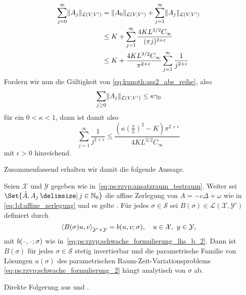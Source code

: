 \begin{Satz}
\begin{Beweis}
        \begin{align}
                    \sum_{j = 0}^{\infty} \lVert A_{j}\rVert_{\mathcal L(V, V')}
            &= \lVert A_{0}\rVert_{\mathcal L(V, V')} + \sum_{j = 1}^{\infty} \lVert A_{j}\rVert_{\mathcal L(V, V')}
            \\&\leq K + \sum_{j = 1}^{\infty} \frac{4 K L^{3 / 2} C_{\infty}}{(\pi j)^{2 + \varepsilon}}
            \\&\leq K + \frac{4 K L^{3 / 2} C_{\infty}}{\pi^{2+ \varepsilon}} \sum_{j = 1}^{\infty} \frac{1}{j^{2 + \varepsilon}}
        \end{align}
        Fordern wir nun die Gültigkeit von \eqref{eq:kunoth:ass2_abs_reihe}, also
        \begin{equation}
            \sum_{j \geq 0} \lVert A_{j}\rVert_{\mathcal L(V, V')} \leq \kappa \gamma_{0}
        \end{equation}
        für ein $0 < \kappa < 1$, dann ist damit also
        \begin{equation}
            \sum_{j = 1}^{\infty} \frac{1}{j^{2 + \epsilon}} \leq \frac{(\kappa (\tfrac{\pi}{L})^{2} - K) \pi^{2+ \epsilon}}{4 K L^{3/2} C_{\infty}}
        \end{equation}
        mit $\epsilon > 0$ hinreichend.
    \end{Beweis}
\end{Satz}

Zusammenfassend erhalten wir damit die folgende Aussage.

\begin{Satz}
    Seien $\mathcal X$ und $\mathcal Y$ gegeben wie in~\eqref{eq:ps:rzvp:ansatzraum_testraum}.
    Weiter sei $\Set{\hat A, A_{j} \given j \in \mathbb{N}_{0}}$ die affine Zerlegung von $A = -c \Delta + \omega$ wie in \eqref{eq:1d:affine_zerlegung} und es gelte .
    Für jedes $\sigma \in \mathcal S$ sei $B(\sigma) \in \mathcal L(\mathcal X, \mathcal Y')$ definiert durch
    \begin{equation}
        \label{eq:ps:rg:theorem21_variationsproblem_als_operatorgleichung_parametrisch}
        \left\langle B(\sigma) u,v\right\rangle_{\mathcal Y' \times \mathcal Y} = b(u, v; \sigma), \quad u \in \mathcal X,~y \in \mathcal Y,
    \end{equation}
    mit $b({\mkern2mu\cdot\mkern2mu}, {\mkern2mu\cdot\mkern2mu}; \sigma)$ wie in~\eqref{eq:ps:rzvp:schwache_formulierung_lhs_b_2}.
    Dann ist $B(\sigma)$ für jedes $\sigma \in \mathcal S$ stetig invertierbar und die parametrische Familie von Lösungen $u(\sigma)$ des parametrischen Raum-Zeit-Variationsproblems \eqref{eq:ps:rzvp:schwache_formulierung_2} hängt analytisch von $\sigma$ ab.

    \begin{Beweis}
        Direkte Folgerung aus  und .
    \end{Beweis}
\end{Satz}

